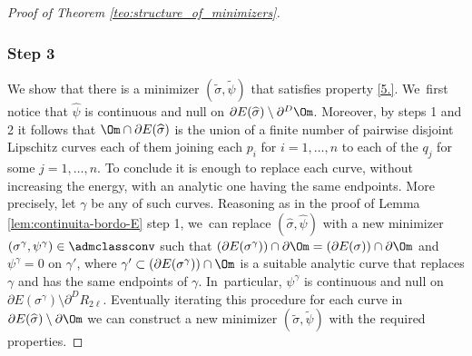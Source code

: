 \begin{proof}[Proof of Theorem \ref{teo:structure_of_minimizers}]
\subsubsection*{Step 3} We show that there is a minimizer $(\widetilde\sigma,\widetilde\psi)$ that satisfies property \ref{5.}. We~first notice that $\widehat\psi$ is continuous and null on $\partial E(\widehat\sigma)\setminus\partial^D\Om$.
Moreover, by steps 1 and 2 it follows that $\Om\cap \partial E(\widehat\sigma)$ is the union of a finite number of pairwise disjoint Lipschitz curves each of them joining each $p_i$ for $i=1,\dots,n$ to each of the $q_j$ for some $j=1,\dots,n$.
To conclude it is enough to replace each curve, without increasing the energy, with an analytic one having the same endpoints.
More precisely, let $\gamma$ be any of such curves. Reasoning as in the proof of Lemma \ref{lem:continuita-bordo-E} step 1, we~can replace $(\widehat\sigma,\widehat\psi)$ with a new minimizer $(\sigma^\gamma,\psi^\gamma)\in\admclassconv$ such that $(\partial E(\sigma^\gamma))\cap\partial\Om=(\partial E(\sigma))\cap\partial\Om$
and
$\psi^\gamma=0$ on $\gamma'$, where
$\gamma'\subset(\partial E(\sigma^\gamma))\cap\Om$ is a suitable analytic curve that replaces $\gamma$ and has the same endpoints of $\gamma$.
In~particular, $\psi^\gamma$ is continuous and null on $\partial E(\sigma^\gamma)\setminus\partial^DR_{2\ell}$.
Eventually iterating this procedure for each curve in $\partial E(\widehat\sigma)\setminus\partial\Om$ we can construct a new minimizer
$(\widetilde\sigma,\widetilde\psi)$ with the required properties.
\end{proof}

